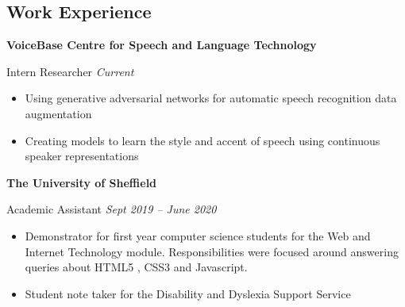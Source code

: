 \documentclass[10pt]{article} %
\begin{document}
\begin{changemargin}{0pt}{0.5pt} %

\begin{minipage}[t]{0.5\textwidth} %
\vspace{0pt} %


\section{Work Experience}

\begin{changemargin}{5pt}{5pt}

\textbf{VoiceBase Centre for Speech and Language Technology}\\
\par
\vspace{-10pt}
Intern Researcher \hfill \textit{Current}\\
\vspace{-5pt}

\begin{itemize} \itemsep-2pt %
  \item Using generative adversarial networks for automatic speech recognition data augmentation
  \item Creating models to learn the style and accent of speech using continuous speaker representations
\end{itemize}


\textbf{The University of Sheffield}\\
\par
\vspace{-10pt}
Academic Assistant \hfill \textit{Sept 2019 -- June 2020}\\
\vspace{-5pt}

\begin{itemize} \itemsep-2pt %
  \item Demonstrator for first year computer science students for the Web and Internet Technology module. Responsibilities were focused around answering queries about HTML5 , CSS3 and Javascript.
  \item Student note taker for the Disability and Dyslexia Support Service
\end{itemize}


\end{changemargin}
\end{minipage}
\end{changemargin}
\end{document}
